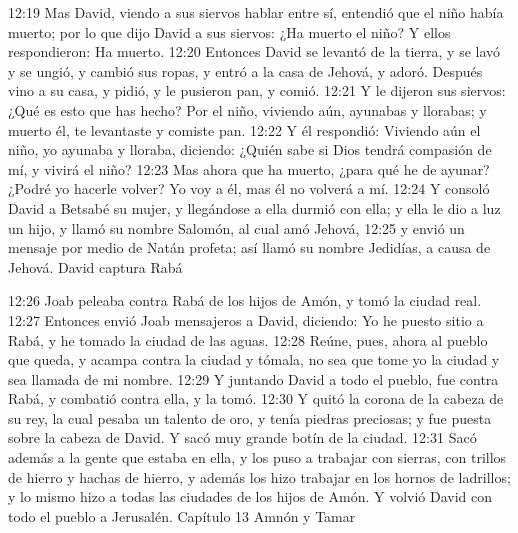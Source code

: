 12:19 Mas David, viendo a sus siervos hablar entre sí, entendió que el niño había muerto; por lo que dijo David a sus siervos: ¿Ha muerto el niño? Y ellos respondieron: Ha muerto.  
12:20 Entonces David se levantó de la tierra, y se lavó y se ungió, y cambió sus ropas, y entró a la casa de Jehová, y adoró. Después vino a su casa, y pidió, y le pusieron pan, y comió.  
12:21 Y le dijeron sus siervos: ¿Qué es esto que has hecho? Por el niño, viviendo aún, ayunabas y llorabas; y muerto él, te levantaste y comiste pan.  
12:22 Y él respondió: Viviendo aún el niño, yo ayunaba y lloraba, diciendo: ¿Quién sabe si Dios tendrá compasión de mí, y vivirá el niño?  
12:23 Mas ahora que ha muerto, ¿para qué he de ayunar? ¿Podré yo hacerle volver? Yo voy a él, mas él no volverá a mí.  
12:24 Y consoló David a Betsabé su mujer, y llegándose a ella durmió con ella; y ella le dio a luz un hijo, y llamó su nombre Salomón, al cual amó Jehová,  
12:25 y envió un mensaje por medio de Natán profeta; así llamó su nombre Jedidías, a causa de Jehová.  
David captura Rabá  
 
12:26 Joab peleaba contra Rabá de los hijos de Amón, y tomó la ciudad real.  
12:27 Entonces envió Joab mensajeros a David, diciendo: Yo he puesto sitio a Rabá, y he tomado la ciudad de las aguas.  
12:28 Reúne, pues, ahora al pueblo que queda, y acampa contra la ciudad y tómala, no sea que tome yo la ciudad y sea llamada de mi nombre.  
12:29 Y juntando David a todo el pueblo, fue contra Rabá, y combatió contra ella, y la tomó.  
12:30 Y quitó la corona de la cabeza de su rey, la cual pesaba un talento de oro,  y tenía piedras preciosas; y fue puesta sobre la cabeza de David. Y sacó muy grande botín de la ciudad.  
12:31 Sacó además a la gente que estaba en ella, y los puso a trabajar con sierras, con trillos de hierro y hachas de hierro, y además los hizo trabajar en los hornos de ladrillos; y lo mismo hizo a todas las ciudades de los hijos de Amón. Y volvió David con todo el pueblo a Jerusalén.  
Capítulo 13 
Amnón y Tamar  

